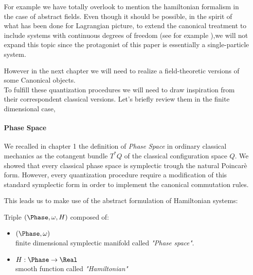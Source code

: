 \documentclass[Main]{subfiles}
\begin{document}
	For example we have totally overlook to mention the hamiltonian formalism in the case of abstract fields.
	Even though it should be possible, in the spirit of what has been done for Lagrangian picture, to extend the canonical treatment to include systems with continuous degrees of freedom (see for example \cite{Giachetta1999}),we will not expand this topic since the protagonist of this paper is essentially a single-particle system.
	
	However in the next chapter we will need to realize a field-theoretic versions of some Canonical objects.\\
	To fulfill these quantization procedures we will need to draw inspiration from their correspondent classical versions.	Let's briefly review them in the finite dimensional case,
	
			\paragraph{Phase Space}
		We recalled in chapter 1 the definition of \emph{Phase Space} in ordinary classical mechanics as the cotangent bundle $T^*Q$ of the classical configuration space $Q$.
		We showed that every classical phase space is symplectic trough the natural Poincarè form.
		However, every quantization procedure require a modification of this standard symplectic form in order to implement the canonical commutation rules.
	
	This leads us to make use of the abstract formulation of Hamiltonian systems\cite{Abraham1978}:
	
	\begin{definition}
			Triple $(\Phase,\omega, H )$ composed of:
		\begin{itemize}
			\item $(\Phase,\omega)$ \\ finite dimensional symplectic manifold called \emph{"Phase space"}.
			\item	$ H :\Phase \rightarrow \Real$ \\  smooth function called \emph{"Hamiltonian"}
		\end{itemize}
	\end{definition}
	
\end{document}
